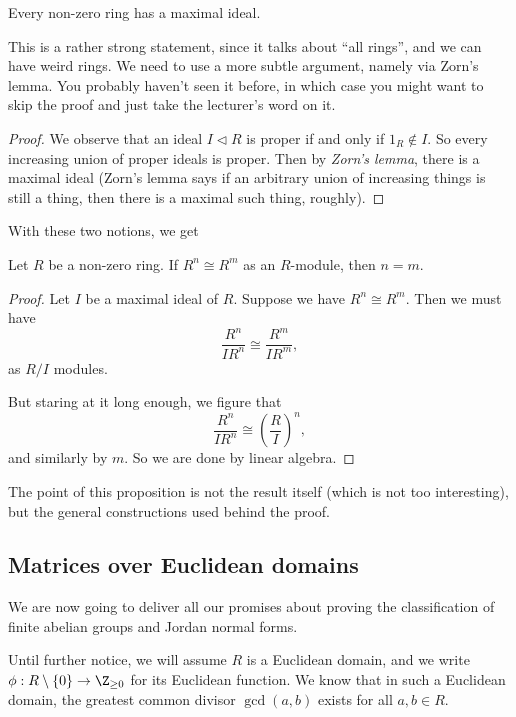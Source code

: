 \documentclass[a4paper]{article}
\begin{document}
\begin{prop}
  Every non-zero ring has a maximal ideal.
\end{prop}
This is a rather strong statement, since it talks about ``all rings'', and we can have weird rings. We need to use a more subtle argument, namely via Zorn's lemma. You probably haven't seen it before, in which case you might want to skip the proof and just take the lecturer's word on it.

\begin{proof}
  We observe that an ideal $I \lhd R$ is proper if and only if $1_R \not\in I$. So every increasing union of proper ideals is proper. Then by \emph{Zorn's lemma}, there is a maximal ideal (Zorn's lemma says if an arbitrary union of increasing things is still a thing, then there is a maximal such thing, roughly).
\end{proof}

With these two notions, we get
\begin{prop}
  Let $R$ be a non-zero ring. If $R^n \cong R^m$ as an $R$-module, then $n = m$.
\end{prop}

\begin{proof}
  Let $I$ be a maximal ideal of $R$. Suppose we have $R^n \cong R^m$. Then we must have
  \[
    \frac{R^n}{IR^n} \cong \frac{R^m}{IR^m},
  \]
  as $R/I$ modules.

  But staring at it long enough, we figure that
  \[
    \frac{R^n}{IR^n} \cong \left(\frac{R}{I}\right)^n,
  \]
  and similarly by $m$. So we are done by linear algebra.
\end{proof}
The point of this proposition is not the result itself (which is not too interesting), but the general constructions used behind the proof.

\subsection{Matrices over Euclidean domains}
We are now going to deliver all our promises about proving the classification of finite abelian groups and Jordan normal forms.

Until further notice, we will assume $R$ is a Euclidean domain, and we write $\phi: R\setminus \{0\} \to \Z_{\geq 0}$ for its Euclidean function. We know that in such a Euclidean domain, the greatest common divisor $\gcd(a, b)$ exists for all $a, b \in R$.
\end{document}
